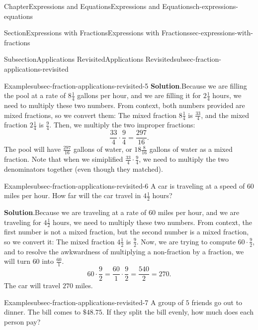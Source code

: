 \documentclass[twoside,11pt,]{book}
\newcommand{\blocktitlefont}{\relax}
\numberwithin{equation}{chapter}
\begin{document}
\begin{chapterptx}{Chapter}{Expressions and Equations}{}{Expressions and Equations}{}{}{ch-expressions-equations}
\begin{sectionptx}{Section}{Expressions with Fractions}{}{Expressions with Fractions}{}{}{sec-expressions-with-fractions}
\begin{subsectionptx}{Subsection}{Applications Revisited}{}{Applications Revisited}{}{}{subsec-fraction-applications-revisited}
\begin{example}{Example}{}{subsec-fraction-applications-revisited-5}
\noindent\textbf{\blocktitlefont Solution}.\hypertarget{subsec-fraction-applications-revisited-5-2}{}\quad{}Because we are filling the pool at a rate of \(8\frac{1}{4}\) gallons per hour, and we are filling it for \(2\frac{1}{4}\) hours, we need to multiply these two numbers. From context, both numbers provided are mixed fractions, so we convert them: The mixed fraction \(8\frac{1}{4}\) is \(\frac{33}{4}\), and the mixed fraction \(2\frac{1}{4}\) is \(\frac{9}{4}\). Then, we multiply the two improper fractions:%
\begin{equation*}
\frac{33}{4} \cdot \frac{9}{4} = \frac{297}{16}.
\end{equation*}
The pool will have \(\frac{297}{16}\) gallons of water, or \(18 \frac{8}{16}\) gallons of water as a mixed fraction. Note that when we simiplified \(\frac{33}{4} \cdot \frac{9}{4}\), we need to multiply the two denominators together (even though they matched).%
\end{example}
\begin{example}{Example}{}{subsec-fraction-applications-revisited-6}%
A car is traveling at a speed of \(60\) miles per hour. How far will the car travel in \(4\frac{1}{2}\) hours?%
\par\smallskip%
\noindent\textbf{\blocktitlefont Solution}.\hypertarget{subsec-fraction-applications-revisited-6-2}{}\quad{}Because we are traveling at a rate of \(60\) miles per hour, and we are traveling for \(4\frac{1}{2}\) hours, we need to multiply these two numbers. From context, the first number is not a mixed fraction, but the second number is a mixed fraction, so we convert it: The mixed fraction \(4\frac{1}{2}\) is \(\frac{9}{2}\). Now, we are trying to compute \(60 \cdot \frac{9}{2}\), and to resolve the awkwardness of multiplying a non-fraction by a fraction, we will turn \(60\) into \(\frac{60}{1}\).%
\begin{equation*}
60 \cdot \frac{9}{2} = \frac{60}{1} \cdot \frac{9}{2} = \frac{540}{2} = 270.
\end{equation*}
The car will travel \(270\) miles.%
\end{example}
\begin{example}{Example}{}{subsec-fraction-applications-revisited-7}%
A group of \(5\) friends go out to dinner. The bill comes to \(\$48.75\). If they split the bill evenly, how much does each person pay?%
\par\smallskip%

\end{example}
\end{subsectionptx}
\end{sectionptx}
\end{chapterptx}
\end{document}
